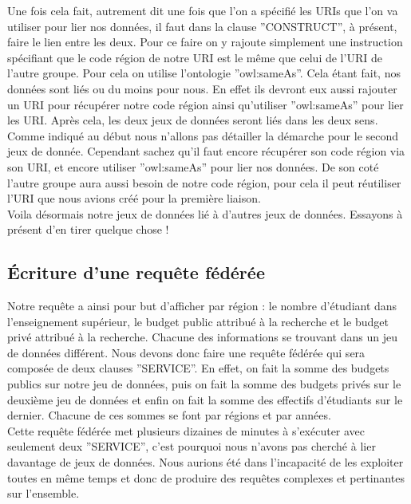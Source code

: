 \documentclass[a4paper,sffamily,12pt]{article}
\begin{document}
			\indent Une fois cela fait, autrement dit une fois que l'on a spécifié les URIs que l'on va utiliser pour lier nos données, il faut dans la clause ''CONSTRUCT'', à présent, faire le lien entre les deux. Pour ce faire on y rajoute simplement une instruction spécifiant que le code région de notre URI est le même que celui de l'URI de l'autre groupe. Pour cela on utilise l'ontologie ''owl:sameAs''. Cela étant fait, nos données sont liés ou du moins pour nous. En effet ils devront eux aussi rajouter un URI pour récupérer notre code région  ainsi qu'utiliser ''owl:sameAs'' pour lier les URI. Après cela, les deux jeux de données seront liés dans les deux sens. \\
			
			\indent Comme indiqué au début nous n'allons pas détailler la démarche pour le second jeux de donnée. Cependant sachez qu'il faut encore récupérer son code région via son URI, et encore utiliser ''owl:sameAs'' pour lier nos données. De son coté l'autre groupe aura aussi besoin de notre code région, pour cela il peut réutiliser l'URI que nous avions créé pour la première liaison. \\
			
			\indent Voila désormais notre jeux de données lié à d'autres jeux de données. Essayons à présent d'en tirer quelque chose !
						
			\vspace{0.5cm}
			
		\subsection{Écriture d'une requête fédérée}
			
			\vspace{0.5cm}
			
			Notre requête a ainsi pour but d'afficher par région : le nombre d'étudiant dans l'enseignement supérieur, le budget public attribué à la recherche et le budget privé attribué à la recherche. Chacune des informations se trouvant dans un jeu de données différent. Nous devons donc faire une requête fédérée qui sera composée de deux clauses ''SERVICE''. En effet, on fait la somme des budgets publics sur notre jeu de données, puis on fait la somme des budgets privés sur le deuxième jeu de données et enfin on fait la somme des effectifs d'étudiants sur le dernier. Chacune de ces sommes se font par régions et par années. \\
			
			\indent Cette requête fédérée met plusieurs dizaines de minutes à s'exécuter avec seulement deux ''SERVICE'', c'est pourquoi nous n'avons pas cherché à lier davantage de jeux de données. Nous aurions été dans l'incapacité de les exploiter toutes en même temps et donc de produire des requêtes complexes et pertinantes sur l'ensemble.
\end{document}
